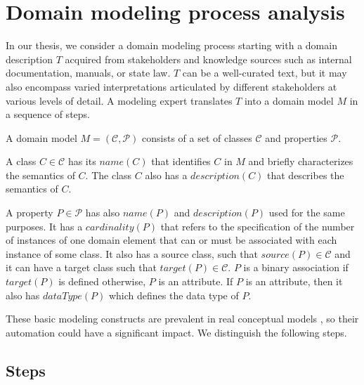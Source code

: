 \chapter{Domain modeling process analysis}
\label{chap:domain_modeling_process_analysis}

In our thesis, we consider a domain modeling process starting with a domain description $T$ acquired from stakeholders and knowledge sources such as internal documentation, manuals, or state law. $T$ can be a well-curated text, but it may also encompass varied interpretations articulated by different stakeholders at various levels of detail. A modeling expert translates $T$ into a domain model $M$ in a sequence of steps.

A domain model $M = (\mathcal{C}, \mathcal{P})$ consists of a set of classes $\mathcal{C}$ and properties $\mathcal{P}$.

A class $C \in \mathcal{C}$ has its $name(C)$ that identifies $C$ in $M$ and briefly characterizes the semantics of $C$. The class $C$ also has a $description(C)$ that describes the semantics of $C$.

A property $P \in \mathcal{P}$ has also $name(P)$ and $description(P)$ used for the same purposes. It has a $cardinality(P)$ that refers to the specification of the number of instances of one domain element that can or must be associated with each instance of some class. It also has a source class, such that $source(P) \in \mathcal{C}$ and it can have a target class such that $target(P) \in \mathcal{C}$. $P$ is a binary association if $target(P)$ is defined otherwise, $P$ is an attribute. If $P$ is an attribute, then it also has $dataType(P)$ which defines the data type of $P$.

These basic modeling constructs are prevalent in real conceptual models \cite{Keet2015}, so their automation could have a significant impact. We distinguish the following steps.


\section{Steps}
\label{sec:modeling_steps}

